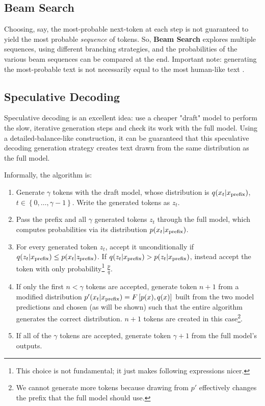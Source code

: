 \documentclass[11pt]{article}
\begin{document}
\subsection{Beam Search \label{subsec_beam_search}}

Choosing, say, the most-probable next-token at each step is not guaranteed to yield the most
probable \textit{sequence} of tokens. So, \textbf{Beam Search} explores multiple sequences, using
different branching strategies, and the probabilities of the various beam sequences can be compared
at the end. Important note: generating the most-probable text is not necessarily equal to the most
human-like text \cite{holtzman2020curious}.



\subsection{Speculative Decoding \label{subsec_speculative_decoding}}

Speculative decoding \cite{leviathan2023fastinferencetransformersspeculative} is an excellent idea:
use a cheaper "draft" model to perform the slow, iterative generation steps and check its work with
the full model. Using a detailed-balance-like construction, it can be guaranteed that this
speculative decoding generation strategy creates text drawn from the same distribution as the full
model.

Informally, the algorithm is:
\begin{enumerate}
    \item Generate $ \gamma  $ tokens with the draft model, whose distribution is $ q(x _{ t }|x _{
        {\rm  prefix} }) $, $ t \in \left \{ 0, \ldots , \gamma -1 \right \} $. Write the generated
        tokens as $ z _{ t } $.
    \item Pass the prefix and all $ \gamma  $ generated tokens $ z _{ t } $ through the full model,
        which computes probabilities via its distribution $ p(x _{ t }|x _{ {\rm  prefix} }) $.
    \item For every generated token $ z _{ t } $, accept it
        unconditionally if $ q(z_t| x _{ {\rm  prefix} })\le p(x_t| z _{ {\rm  prefix} })  $. If $
         q(z_t| x _{ {\rm  prefix} }) > p(z_t| x _{ {\rm  prefix} })$, instead accept the token
        with only probability\footnote{This choice is not fundamental; it just makes following
        expressions nicer.} $ \frac{ p }{ q } $.
    \item If only the first $ n < \gamma  $ tokens are accepted, generate token $ n+1 $ from a
        modified distribution $ p'(x_t| x _{ {\rm prefix} }) = F \left [ p(x), q(x) \right ]$ built
        from the two model predictions and chosen (as will be shown) such that the entire algorithm
        generates the correct distribution. $ n+1 $ tokens are created in this case\footnote{We
        cannot generate more tokens because drawing from $ p' $ effectively changes the prefix that the
        full model should use.}.
    \item If all of the $ \gamma  $ tokens are accepted, generate token $ \gamma +1 $ from the full
        model's outputs.
\end{enumerate}
\end{document}
